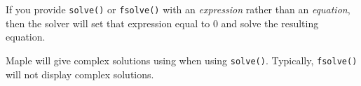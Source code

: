 If you provide \texttt{solve()} or \texttt{fsolve()} with an \textit{expression} rather than an \textit{equation}, then the solver will set that expression equal to $0$ and solve the resulting equation.

\begin{maplegroup}
\begin{mapleinput}
\end{mapleinput}
\mapleresult
\begin{maplelatex}
\end{maplelatex}
\end{maplegroup}

\begin{maplegroup}
\begin{mapleinput}
\end{mapleinput}
\mapleresult
\begin{maplelatex}
\end{maplelatex}
\end{maplegroup}

Maple will give complex solutions using  when using \texttt{solve()}. Typically, \texttt{fsolve()} will not display complex solutions.

\begin{maplegroup}
\begin{mapleinput}
\end{mapleinput}
\mapleresult
\begin{maplelatex}
\end{maplelatex}
\end{maplegroup}

